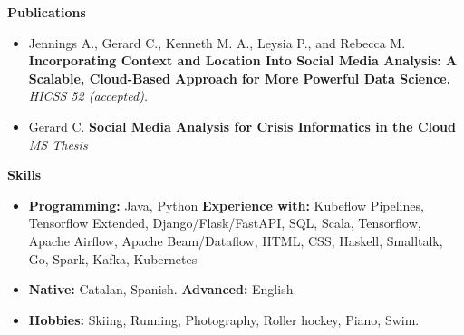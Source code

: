 \documentclass[letterpaper,10pt]{article}
\newcommand{\resitem}[1]{\item #1 \vspace{-2pt}}
\newcommand{\resheading}[1]{{\large \colorbox{mygrey}{\begin{minipage}{\textwidth}{\textbf{#1 \vphantom{p\^{E}}}}\end{minipage}}}}
\begin{document}
\resheading{Publications}
	\begin{itemize}
		\item 	Jennings A., Gerard C., Kenneth M. A., Leysia P., and Rebecca M.  \textbf{Incorporating Context and Location Into Social Media Analysis: A Scalable, Cloud-Based Approach for More Powerful Data Science.}  \textit{HICSS 52 (accepted).}
        \item Gerard C. \textbf{Social Media Analysis for Crisis Informatics in the Cloud} \textit{MS Thesis}
	\end{itemize}


\resheading{Skills}
	\begin{itemize}
		\resitem{\textbf{Programming:} Java, Python \textbf{Experience with:} Kubeflow Pipelines, Tensorflow Extended, Django/Flask/FastAPI, SQL, Scala, Tensorflow, Apache Airflow, Apache Beam/Dataflow, HTML, CSS, Haskell, Smalltalk, Go, Spark, Kafka, Kubernetes}
		\resitem{\textbf{Native:} Catalan, Spanish. \textbf{Advanced:} English.}
		\resitem{\textbf{Hobbies:} Skiing, Running, Photography, Roller hockey, Piano, Swim.}
	\end{itemize}
\end{document}
